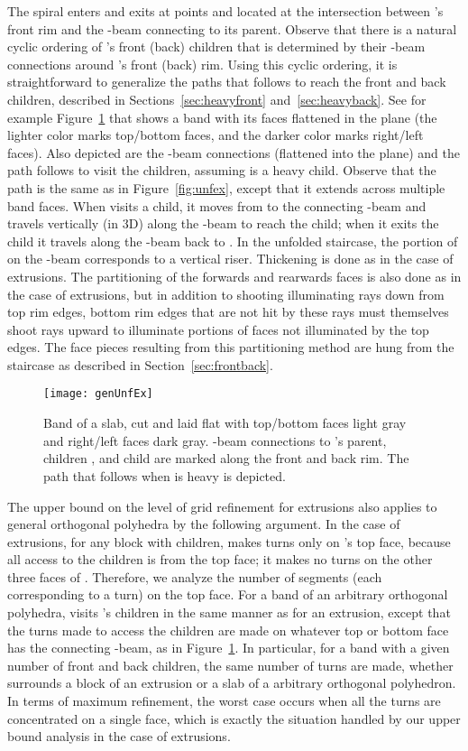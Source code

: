 \documentclass[11pt]{article}
\begin{document}
The spiral  enters and exits  at points  and 
located at the intersection between 's front rim and the -beam
connecting  to its parent.
Observe that there is a natural cyclic ordering of 's front (back) children that is determined by their
-beam connections around 's front (back) rim.  Using this cyclic ordering, it
is straightforward to generalize the paths that  follows to reach the
front and back children, described in Sections~\ref{sec:heavyfront} and~\ref{sec:heavyback}.
See for example Figure~\ref{fig:genUnfEx} that shows a band with its faces flattened in the plane (the lighter color marks top/bottom faces, and
the darker color marks right/left faces). Also depicted are
the -beam connections (flattened into the plane) and the path   follows
to visit the children, assuming  is a heavy child. Observe that the path is
the same as in Figure~\ref{fig:unfex}, except that it extends across multiple band faces.
When  visits a child, it moves from  to
the connecting -beam and travels vertically (in 3D) along the -beam to reach the child;
when it exits the child it travels along the -beam back to .
In the unfolded staircase, the portion
of  on the -beam corresponds to a vertical riser. Thickening  is done
as in the case of extrusions. The partitioning of the
forwards and rearwards faces is also done as in the case of extrusions, but
in addition to shooting illuminating rays down from top rim edges, bottom rim edges that are not hit by these rays must
themselves shoot rays upward to illuminate portions of faces not illuminated by
the top edges. The face pieces resulting from this partitioning method
are hung from the staircase as described in Section~\ref{sec:frontback}. \begin{figure}[htbp]
\centering
\texttt{[image: genUnfEx]}
\caption{Band  of a slab, cut and laid flat with top/bottom faces light gray and right/left
faces dark gray. -beam connections to 's parent, children , and child 
are marked along the front and back rim. The path that  follows
when  is heavy is depicted.}
\label{fig:genUnfEx}
\end{figure}


The  upper bound on the level of grid refinement for extrusions also applies to general orthogonal polyhedra by the following argument. In the case of extrusions, for any block  with children,  makes turns only
on 's top face, because all access to the children is
from the top face; it makes no turns on the other three faces of .
Therefore, we analyze the
number of segments (each corresponding to a turn) on the top face. For a band 
of an arbitrary orthogonal polyhedra,  visits 's children in the same manner as for
an extrusion, except that the turns made to access the children are made
on whatever top or bottom face has the connecting -beam, as in Figure~\ref{fig:genUnfEx}. In particular, for a band  with a given number
of front and back children, the same number of turns are made, whether
 surrounds a block of an extrusion or a slab of a arbitrary orthogonal polyhedron.
In terms of maximum refinement, the worst case occurs when all the turns are
concentrated on a single face, which is exactly the situation handled by our upper bound
analysis in the case of extrusions.
\end{document}
